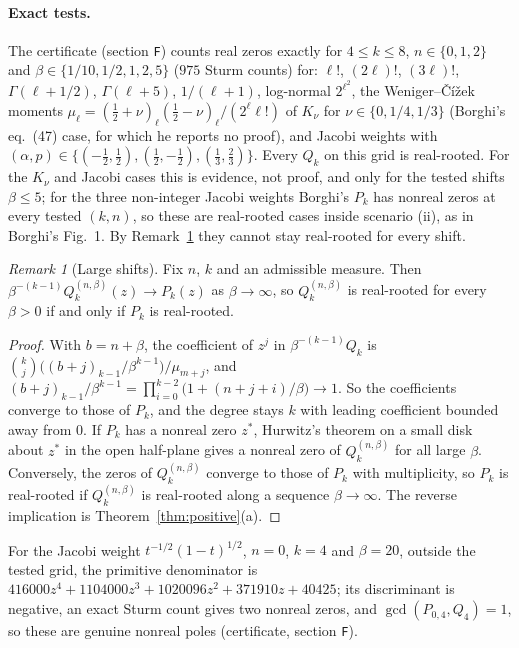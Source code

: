 \documentclass[11pt,a4paper]{article}
\theoremstyle{definition}
\theoremstyle{remark}
\newtheorem{remark}[theorem]{Remark}
\begin{document}
\paragraph{Exact tests.}
The certificate (section \texttt{F}) counts real zeros exactly for
$4\le k\le8$, $n\in\{0,1,2\}$ and $\beta\in\{1/10,1/2,1,2,5\}$ ($975$ Sturm
counts) for: $\ell!$, $(2\ell)!$, $(3\ell)!$, $\Gamma(\ell+1/2)$,
$\Gamma(\ell+5)$, $1/(\ell+1)$, log-normal $2^{\ell^2}$, the
Weniger--Čížek moments $\mu_\ell=(\tfrac12+\nu)_\ell(\tfrac12-\nu)_\ell/(2^\ell\ell!)$
of $K_\nu$ \cite{WenigerCizek1990} for $\nu\in\{0,1/4,1/3\}$ (Borghi's eq.~(47)
case, for which he reports no proof), and Jacobi weights with
$(\alpha,p)\in\{(-\tfrac12,\tfrac12),(\tfrac12,-\tfrac12),(\tfrac13,\tfrac23)\}$.
Every $Q_k$ on this grid is real-rooted. For the $K_\nu$ and Jacobi cases
this is evidence, not proof, and only for the tested shifts
$\beta\le5$; for the three non-integer Jacobi weights
Borghi's $P_k$ has nonreal zeros at every tested $(k,n)$, so these are
real-rooted cases inside scenario (ii), as in Borghi's Fig.~1. By
Remark~\ref{rem:largeshift} they cannot stay real-rooted for every shift.

\begin{remark}[Large shifts]\label{rem:largeshift}
Fix $n$, $k$ and an admissible measure. Then
$\beta^{-(k-1)}Q_k^{(n,\beta)}(z)\to P_k(z)$ as $\beta\to\infty$, so
$Q_k^{(n,\beta)}$ is real-rooted for every $\beta>0$ if and only if $P_k$
is real-rooted.
\end{remark}
\begin{proof}
With $b=n+\beta$, the coefficient of $z^j$ in $\beta^{-(k-1)}Q_k$ is
$\binom kj\bigl((b+j)_{k-1}/\beta^{k-1}\bigr)/\mu_{m+j}$, and
$(b+j)_{k-1}/\beta^{k-1}=\prod_{i=0}^{k-2}\bigl(1+(n+j+i)/\beta\bigr)\to1$.
So the coefficients converge to those of $P_k$, and the degree stays $k$
with leading coefficient bounded away from $0$. If $P_k$ has a nonreal
zero $z^*$, Hurwitz's theorem on a small disk about $z^*$ in the open
half-plane gives a nonreal zero of $Q_k^{(n,\beta)}$ for all large $\beta$.
Conversely, the zeros of $Q_k^{(n,\beta)}$ converge to those of $P_k$ with
multiplicity, so $P_k$ is real-rooted if $Q_k^{(n,\beta)}$ is real-rooted
along a sequence $\beta\to\infty$. The reverse implication is
Theorem~\ref{thm:positive}(a).
\end{proof}
For the Jacobi weight $t^{-1/2}(1-t)^{1/2}$, $n=0$, $k=4$ and $\beta=20$,
outside the tested grid, the primitive denominator is
$416000z^4+1104000z^3+1020096z^2+371910z+40425$; its discriminant is
negative, an exact Sturm count gives two nonreal zeros, and
$\gcd(P_{0,4},Q_4)=1$, so these are genuine nonreal poles (certificate,
section \texttt{F}).
\end{document}
